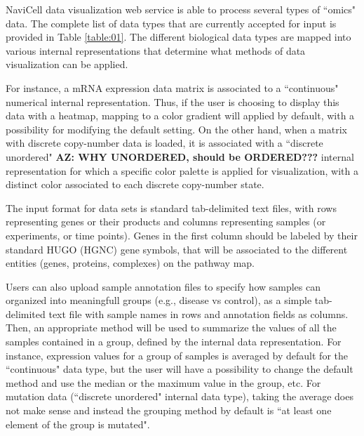 \documentclass[a4,center,fleqn]{NAR}
\begin{document}
NaviCell data visualization web service is able to process
several types of ``omics" data. The complete list of data types that are
currently accepted for input is provided in Table \ref{table:01}. The different biological data
types are mapped into various internal representations that determine what methods
of data visualization can be applied.

For instance, a mRNA expression data matrix is associated to a
``continuous" numerical internal representation. Thus, if the user is choosing to display
this data with a heatmap, mapping to a color gradient will applied by default, with a possibility
for modifying the default setting. On the other hand, when a
matrix with discrete copy-number data is loaded, it is associated with a
``discrete unordered" {\bf AZ: WHY UNORDERED, should be ORDERED???} internal representation for which
a specific color palette is applied for visualization,
with a distinct color associated to each discrete copy-number state.

The input format for data sets is standard tab-delimited text files, with rows
representing genes or their products and columns representing samples (or experiments, or time
points). Genes in the first column should be labeled by their standard HUGO (HGNC)
gene symbols, that will be associated to the different entities (genes,
proteins, complexes) on the pathway map.

Users can also upload sample annotation files to specify how samples can organized into meaningfull groups
(e.g., disease vs control), as a simple tab-delimited text file with sample names in
rows and annotation fields as columns. Then, an appropriate method will be used
to summarize the values of all the samples contained in a group, defined by the
internal data representation. For instance, expression values for a group of samples
is averaged by default for the ``continuous" data type, but the user will have
a possibility to change the default method and use the median or
the maximum value in the group, etc. For mutation data (``discrete unordered" internal data type),
taking the average does not make sense and instead the grouping method by default is
``at least one element of the group is mutated".
\end{document}
